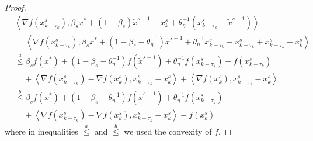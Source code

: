 \documentclass[10pt, conference, compsocconf]{IEEEtran}
\newcommand{\Iprod}[2]{\left\langle #1,#2\right\rangle}
\theoremstyle{definition}
\theoremstyle{remark}
\begin{document}
\begin{proof}
\begin{equation}
\begin{split}
&\Iprod{\nabla f(x_{k-\tau_k}^s)}{\beta_sx^*+(1-\beta_s)\widetilde{x}^{s-1}-{x}^{s}_{k}+\theta_{\eta}^{-1}(x_{k-\tau_k}^s-\widetilde{x}^{s-1})}\\
&=\Iprod{\nabla f(x_{k-\tau_k}^s)}{\beta_sx^*+(1-\beta_s-\theta_{\eta}^{-1})\widetilde{x}^{s-1}+\theta_{\eta}^{-1}x_{k-\tau_k}^s-x_{k-\tau_k}^s+x_{k-\tau_k}^s-{x}^{s}_{k}}\\
&\stackrel{a}{\leq} \beta_sf(x^*)+(1-\beta_s-\theta_{\eta}^{-1})f(\widetilde{x}^{s-1})+\theta_{\eta}^{-1}f(x_{k-\tau_k}^s)-f(x_{k-\tau_k}^s)\\
&~~~~~+\Iprod{\nabla f(x_{k-\tau_k}^s)-\nabla f(x_{k}^s)}{x_{k-\tau_k}^s-{x}^{s}_{k}}+\Iprod{\nabla f(x_{k}^s)}{x_{k-\tau_k}^s-{x}^{s}_{k}}\\
&\stackrel{b}{\leq} \beta_sf(x^*)+(1-\beta_s-\theta_{\eta}^{-1})f(\widetilde{x}^{s-1})+\theta_{\eta}^{-1}f(x_{k-\tau_k}^s)\\
&~~~~~+\Iprod{\nabla f(x_{k-\tau_k}^s)-\nabla f(x_{k}^s)}{x_{k-\tau_k}^s-{x}^{s}_{k}}- f(x_{k}^s)
\end{split}
\end{equation}
where in inequalities $\stackrel{a}{\leq}$ and $\stackrel{b}{\leq}$ we used the convexity of $f$. 


\end{proof}
\end{document}
